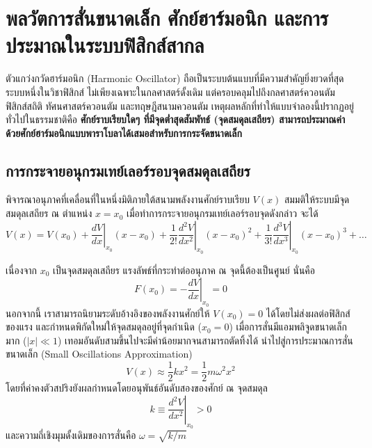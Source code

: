 \newpage

\section{พลวัตการสั่นขนาดเล็ก ศักย์ฮาร์มอนิก และการประมาณในระบบฟิสิกส์สากล}
\label{sec_small_oscillations_potential}

ตัวแกว่งกวัดฮาร์มอนิก (Harmonic Oscillator) ถือเป็นระบบต้นแบบที่มีความสำคัญยิ่งยวดที่สุดระบบหนึ่งในวิชาฟิสิกส์ ไม่เพียงเฉพาะในกลศาสตร์ดั้งเดิม แต่ครอบคลุมไปถึงกลศาสตร์ควอนตัม ฟิสิกส์สถิติ ทัศนศาสตร์ควอนตัม และทฤษฎีสนามควอนตัม เหตุผลหลักที่ทำให้แบบจำลองนี้ปรากฏอยู่ทั่วไปในธรรมชาติคือ \textbf{ศักย์ราบเรียบใดๆ ที่มีจุดต่ำสุดสัมพัทธ์ (จุดสมดุลเสถียร) สามารถประมาณค่าด้วยศักย์ฮาร์มอนิกแบบพาราโบลาได้เสมอสำหรับการกระจัดขนาดเล็ก}

\subsection{การกระจายอนุกรมเทย์เลอร์รอบจุดสมดุลเสถียร}
พิจารณาอนุภาคที่เคลื่อนที่ในหนึ่งมิติภายใต้สนามพลังงานศักย์ราบเรียบ $V(x)$ สมมติให้ระบบมีจุดสมดุลเสถียร ณ ตำแหน่ง $x = x_0$ เมื่อทำการกระจายอนุกรมเทย์เลอร์รอบจุดดังกล่าว จะได้
\begin{equation}
V(x) = V(x_0) + \left. \frac{dV}{dx} \right|_{x_0} (x - x_0) + \frac{1}{2!} \left. \frac{d^2V}{dx^2} \right|_{x_0} (x - x_0)^2 + \frac{1}{3!} \left. \frac{d^3V}{dx^3} \right|_{x_0} (x - x_0)^3 + \dots
\end{equation}

เนื่องจาก $x_0$ เป็นจุดสมดุลเสถียร แรงลัพธ์ที่กระทำต่ออนุภาค ณ จุดนี้ต้องเป็นศูนย์ นั่นคือ
\begin{equation}
F(x_0) = -\left. \frac{dV}{dx} \right|_{x_0} = 0
\end{equation}
นอกจากนี้ เราสามารถนิยามระดับอ้างอิงของพลังงานศักย์ให้ $V(x_0) = 0$ ได้โดยไม่ส่งผลต่อฟิสิกส์ของแรง และกำหนดพิกัดใหม่ให้จุดสมดุลอยู่ที่จุดกำเนิด ($x_0 = 0$) เมื่อการสั่นมีแอมพลิจูดขนาดเล็กมาก ($|x| \ll 1$) เทอมอันดับสามขึ้นไปจะมีค่าน้อยมากจนสามารถตัดทิ้งได้ นำไปสู่การประมาณการสั่นขนาดเล็ก (Small Oscillations Approximation)
\begin{equation}
V(x) \approx \frac{1}{2} k x^2 = \frac{1}{2} m \omega^2 x^2
\end{equation}
โดยที่ค่าคงตัวสปริงยังผลกำหนดโดยอนุพันธ์อันดับสองของศักย์ ณ จุดสมดุล
\begin{equation}
k \equiv \left. \frac{d^2V}{dx^2} \right|_{x_0} > 0
\end{equation}
และความถี่เชิงมุมดั้งเดิมของการสั่นคือ $\omega = \sqrt{k/m}$

